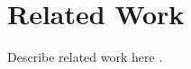 \section{Related Work}
\label{sec:related-work}

Describe related work here \cite{paxson2004strategies}.



